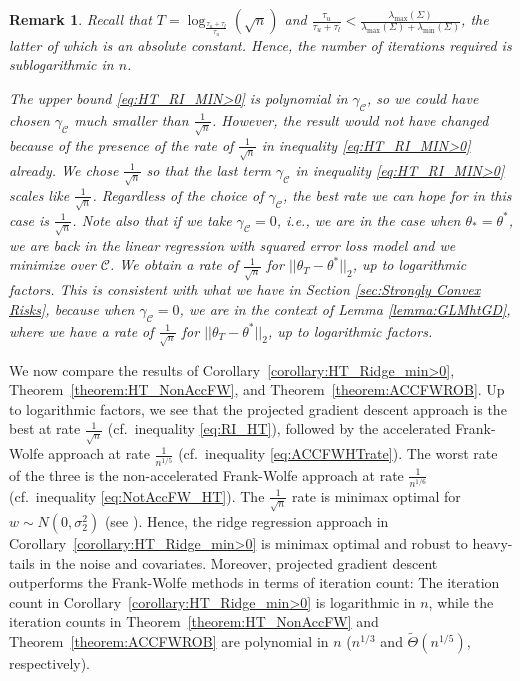 \documentclass{article}
\newtheorem{remark}{\textbf{Remark}}
\begin{document}
\begin{remark}
Recall that $T = \log_{\frac{\tau_u + \tau_l}{\tau_u}}(\sqrt{n})$ and $\frac{\tau_u}{\tau_u + \tau_l} < \frac{\lambda_{\max}(\Sigma)}{\lambda_{\max}(\Sigma) + \lambda_{\min}(\Sigma)}$, the latter of which is an absolute constant. Hence, the number of iterations required is sublogarithmic in $n$.

The upper bound \eqref{eq:HT_RI_MIN>0} is polynomial in $\gamma_{\mathcal{C}}$, so we could have chosen $\gamma_{\mathcal{C}}$ much smaller than $\frac{1}{\sqrt{n}}$. However, the result would not have changed because of the presence of the rate of $\frac{1}{\sqrt{n}}$ in inequality \eqref{eq:HT_RI_MIN>0} already. We chose $\frac{1}{\sqrt{n}}$ so that the last term $\gamma_{\mathcal{C}}$ in inequality \eqref{eq:HT_RI_MIN>0} scales like $\frac{1}{\sqrt{n}}$. Regardless of the choice of $\gamma_{\mathcal{C}}$, the best rate  we can hope for in this case is $\frac{1}{\sqrt{n}}$. Note also that if we take $\gamma_{\mathcal{C}} = 0$, i.e., we are in the case when $\theta_* = \theta^*$, we are back in the linear regression with squared error loss model and we minimize over $\mathcal{C}$. We obtain a rate of $\frac{1}{\sqrt{n}}$ for $||\theta_T - \theta^*||_2$, up to logarithmic factors. This is consistent with what we have in Section \ref{sec:Strongly Convex Risks}, because when $\gamma_{\mathcal{C}} = 0$, we are in the context of Lemma \ref{lemma:GLMhtGD}, where we have a rate of $\frac{1}{\sqrt{n}}$ for $||\theta_T - \theta^*||_2$, up to logarithmic factors.
\end{remark}


We now compare the results of Corollary~\ref{corollary:HT_Ridge_min>0}, Theorem~\ref{theorem:HT_NonAccFW}, and Theorem~\ref{theorem:ACCFWROB}. Up to logarithmic factors, we see that the projected gradient descent approach is the best at rate $\frac{1}{\sqrt{n}}$ (cf.\ inequality \eqref{eq:RI_HT}), followed by the accelerated Frank-Wolfe approach at rate $\frac{1}{n^{1/5}}$ (cf.\ inequality \eqref{eq:ACCFWHTrate}). The worst rate of the three is the non-accelerated Frank-Wolfe approach at rate $\frac{1}{n^{1/6}}$ (cf.\ inequality \eqref{eq:NotAccFW_HT}). The $\frac{1}{\sqrt{n}}$ rate is minimax optimal for $w \sim N\left(0, \sigma_2^2\right)$ (see \cite{Stats_Info_Duchi}). Hence, the ridge regression approach in Corollary~\ref{corollary:HT_Ridge_min>0} is minimax optimal and robust to heavy-tails in the noise and covariates. Moreover, projected gradient descent outperforms the Frank-Wolfe methods in terms of iteration count: The iteration count in Corollary~\ref{corollary:HT_Ridge_min>0} is logarithmic in $n$, while the iteration counts in Theorem~\ref{theorem:HT_NonAccFW} and Theorem~\ref{theorem:ACCFWROB} are polynomial in $n$ ($n^{1/3}$ and $\widetilde{\Theta}\left(n^{1/5}\right)$, respectively).
\end{document}
